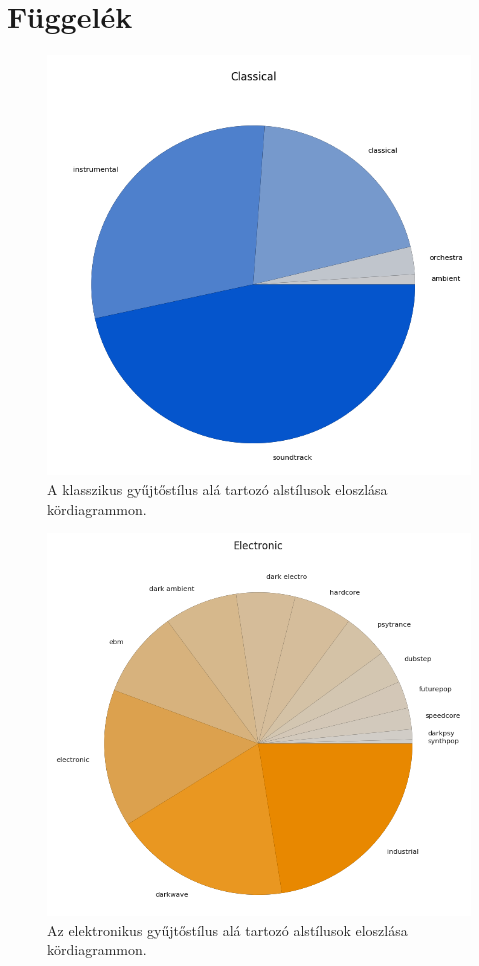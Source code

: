 \pagebreak
\pagestyle{semifancy}
\chapter*{Függelék}

\begin{figure}[H]
    \centering
    \includegraphics[height=0.45\paperheight]{src/images/classical_dist.png}
    \caption{A klasszikus gyűjtőstílus alá tartozó alstílusok eloszlása kördiagrammon.}
\end{figure}

\begin{figure}[p]
    \includegraphics{src/images/electronic_dist.png}
    \caption{Az elektronikus gyűjtőstílus alá tartozó alstílusok eloszlása kördiagrammon.}
\end{figure}

